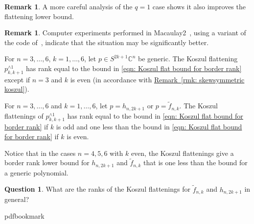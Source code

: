 \documentclass[11pt]{article}
\numberwithin{equation}{section}
\theoremstyle{definition}
\newtheorem{remark}[theorem]{Remark}
\newtheorem{question}[theorem]{Question}
\theoremstyle{plain}
\newcommand{\expref}[2]{\hyperref[#2]{#1~\ref{#2}}}
\newcommand{\vvirg}{ , \dots , }
\newcommand{\bbC}{\mathbb{C}}
\renewcommand{\tilde}[1]{\widetilde{#1}}
\begin{document}
 \begin{remark}
A more careful analysis of the $q=1$ case shows it also improves the flattening lower bound.
\end{remark}


\begin{remark}\label{koscomputer}
Computer experiments performed in Macaulay2~\cite{M2}, using a variant of the code of~\cite{OedOtt:EgnvectorsTensorsAlgorithmsWaringDecomp}, indicate that the situation may be significantly better. 

For $ n = 3 \vvirg 6$, $k = 1 \vvirg 6$, let $p \in S^{2k+1}\bbC^n$ be generic. The Koszul flattening $p_{k,k+1}^{\wedge 1}$ has rank equal to the bound in \eqref{eqn: Koszul flat bound for border rank} except if $n=3$ and $k$ is even (in accordance with \expref{Remark}{rmk: skewsymmetric koszul}).

For  $n = 3 \vvirg 6$ and $k= 1 \vvirg 6$, let $p = h_{n,2k+1}$ or $p = \tilde f_{n,k}$. The Koszul flattenings of $p_{k,k+1}^{\wedge 1}$ has rank equal to the bound in \eqref{eqn: Koszul flat bound for border rank} if $k$ is odd and one less than the bound in \eqref{eqn: Koszul flat bound for border rank} if $k$ is even.
\end{remark}

Notice that in the cases $n=4,5,6$ with $k$ even, the Koszul flattenings give a border rank lower bound for $h_{n,2k+1}$ and $\tilde f_{n,k}$ that is one less than the bound for a generic polynomial.


\begin{question} What are the ranks of the Koszul flattenings for $\tilde f_{n,k}$ and $h_{n,2k+1}$ in general?
\end{question}

\providecommand{\bibhead}[1]{}
\expandafter\ifx\csname pdfbookmark\endcsname\relax%
  \providecommand{\tocrefpdfbookmark}{}
\else\providecommand{\tocrefpdfbookmark}{%
   \hypertarget{tocreferences}{}%
   \pdfbookmark[1]{References}{tocreferences}}%
\fi
\end{document}
